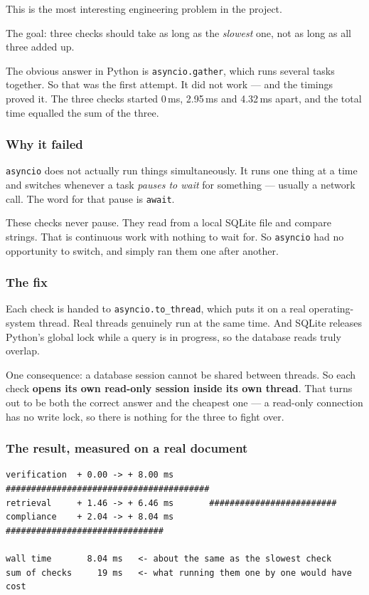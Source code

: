 \documentclass[11pt,a4paper]{article}
\begin{document}
This is the most interesting engineering problem in the project.

The goal: three checks should take as long as the \emph{slowest} one, not as
long as all three added up.

The obvious answer in Python is \texttt{asyncio.gather}, which runs several
tasks together. So that was the first attempt. It did not work --- and the
timings proved it. The three checks started 0\,ms, 2.95\,ms and 4.32\,ms apart,
and the total time equalled the sum of the three.

\subsubsection*{Why it failed}

\texttt{asyncio} does not actually run things simultaneously. It runs one thing
at a time and switches whenever a task \emph{pauses to wait} for something ---
usually a network call. The word for that pause is \texttt{await}.

These checks never pause. They read from a local SQLite file and compare
strings. That is continuous work with nothing to wait for. So \texttt{asyncio}
had no opportunity to switch, and simply ran them one after another.

\subsubsection*{The fix}

Each check is handed to \texttt{asyncio.to\_thread}, which puts it on a real
operating-system thread. Real threads genuinely run at the same time. And SQLite
releases Python's global lock while a query is in progress, so the database
reads truly overlap.

One consequence: a database session cannot be shared between threads. So each
check \textbf{opens its own read-only session inside its own thread}. That turns
out to be both the correct answer and the cheapest one --- a read-only
connection has no write lock, so there is nothing for the three to fight over.

\subsubsection*{The result, measured on a real document}

\begin{lstlisting}
verification  + 0.00 -> + 8.00 ms  ########################################
retrieval     + 1.46 -> + 6.46 ms       #########################
compliance    + 2.04 -> + 8.04 ms         ###############################

wall time       8.04 ms   <- about the same as the slowest check
sum of checks     19 ms   <- what running them one by one would have cost
\end{lstlisting}
\end{document}
